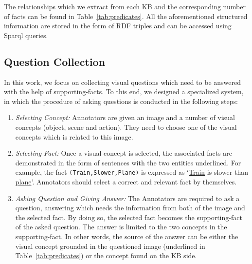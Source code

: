 \documentclass[10pt,journal]{IEEEtran}
\begin{document}
The relationships which we extract from each KB and the corresponding number of facts can be found in Table~\ref{tab:predicates}.
All the aforementioned structured information are stored in the form of RDF triples and can be accessed using Sparql queries.

\subsection{Question Collection}
\label{sec:quescollect}

In this work, we focus on collecting visual questions which need to be answered with the help of supporting-facts.
To this end, we designed a specialized system,
in which the procedure of asking questions is conducted in the following steps:

\begin{enumerate}[label={\arabic*)}]
\item {\em Selecting Concept:} Annotators are given an image and
a number of visual concepts (object, scene and action).
They need to choose one of the visual concepts which is related to this image.

\item {\em Selecting Fact:}
Once a visual concept is selected,
the associated facts are demonstrated in the form of sentences with the two entities underlined.
For example, the fact \texttt{(Train,Slower,Plane)} is expressed as `\underline{Train} is slower than \underline{plane}'.
Annotators should select a correct and relevant fact by themselves.

\item {\em Asking Question and Giving Answer:}
The Annotators are required to ask a question, answering which needs the information from
both of the image and the selected fact.
By doing so, the selected fact becomes the supporting-fact of the asked question.
The answer is limited to the two concepts in the supporting-fact.
In other words, the source of the answer can be either the visual concept grounded in the questioned image (underlined in Table~\ref{tab:predicates}) or the concept found on the KB side.

\end{enumerate}
\end{document}
